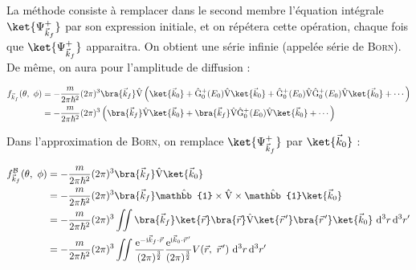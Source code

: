 \documentclass[12pt,a4paper,oneside,french]{book}
\renewcommand{\i}{\mathrm{i}}
\newcommand{\e}{\mathrm{e}}
\newcommand{\opr}[1]{\mathrm{\hat{#1}}}
\newcommand{\diff}{\mathrm{d}}
\newcommand{\identity}{\mathbb{1}}
\newcommand{\pvec}[1]{\vec{#1} \mkern2mu \vphantom{#1}}
\theoremstyle{definition}
\theoremstyle{definition}
\theoremstyle{definition}
\theoremstyle{remark}
\theoremstyle{definition}
\begin{document}
    La méthode consiste à remplacer dans le second membre l'équation intégrale $\ket{{\Psi}_{{\vec{k}}_{f}}^{+}}$ par son expression initiale, et on répétera cette opération, chaque fois que $\ket{{\Psi}_{{\vec{k}}_{f}}^{+}}$ apparaitra. On obtient une série infinie (appelée série de \textsc{Born}). \\
    
    De même, on aura pour l'amplitude de diffusion : 
    
    \begin{equation*}
    \begin{split}
        {f}_{{\vec{k}}_{f}}(\theta, \ \phi) 
            &= -\frac{m}{2\pi {\hbar}^{2}} (2\pi)^{3} \bra{{\vec{k}}_{f}} \opr{V} \left(\ket{{\vec{k}}_{0}} + {\opr{G}}_{0}^{+}({E}_{0}) \opr{V} \ket{{\vec{k}}_{0}} + {\opr{G}}_{0}^{+}({E}_{0}) \opr{V} {\opr{G}}_{0}^{+}({E}_{0}) \opr{V} \ket{{\vec{k}}_{0}} + \cdots\right) \\
            &= -\frac{m}{2\pi {\hbar}^{2}} (2\pi)^{3} \left(\bra{{\vec{k}}_{f}} \opr{V} \ket{{\vec{k}}_{0}} + \bra{{\vec{k}}_{f}} \opr{V} {\opr{G}}_{0}^{+}({E}_{0}) \opr{V} \ket{{\vec{k}}_{0}} + \cdots\right)
    \end{split}
    \end{equation*}
    
    Dans l'approximation de \textsc{Born}, on remplace $\ket{{\Psi}_{{\vec{k}}_{f}}^{+}}$ par $\ket{{\vec{k}}_{0} \vphantom{{\Psi}_{{\vec{k}}_{f}}^{+}}}$ :
    
    \begin{equation*}
    \begin{split}
        {f}_{{\vec{k}}_{f}}^{\mathcal{B}}(\theta, \ \phi) 
            &= -\frac{m}{2\pi {\hbar}^{2}} (2\pi)^{3} \bra{{\vec{k}}_{f}} \opr{V} \ket{{\vec{k}}_{0}} \\
            &= -\frac{m}{2\pi {\hbar}^{2}} (2\pi)^{3} \bra{{\vec{k}}_{f}} \opr{\identity} \times \opr{V} \times \opr{\identity} \ket{{\vec{k}}_{0}} \\
            &= -\frac{m}{2\pi {\hbar}^{2}} (2\pi)^{3} \iint \bra{{\vec{k}}_{f}} \ket{\vec{r} \vphantom{{\vec{k}}_{f}}} \bra{\vec{r} \vphantom{\pvec{r}'}} \opr{V} \ket{\pvec{r}'} \bra{\pvec{r}' \vphantom{{\vec{k}}_{0}}} \ket{{\vec{k}}_{0}} \ {\diff}^{3} r \, {\diff}^{3} r' \\
            &= -\frac{m}{2\pi {\hbar}^{2}} (2\pi)^{3} \iint \frac{{\e}^{-\i {\vec{k}}_{f} \cdot \vec{r}}}{(2\pi)^{\frac{3}{2}}} \frac{{\e}^{\i {\vec{k}}_{0} \cdot \pvec{r}'}}{(2\pi)^{\frac{3}{2}}} V(\vec{r}, \ \pvec{r}') \ {\diff}^{3} r \, {\diff}^{3} r'
    \end{split}
    \end{equation*}
    
\end{document}
